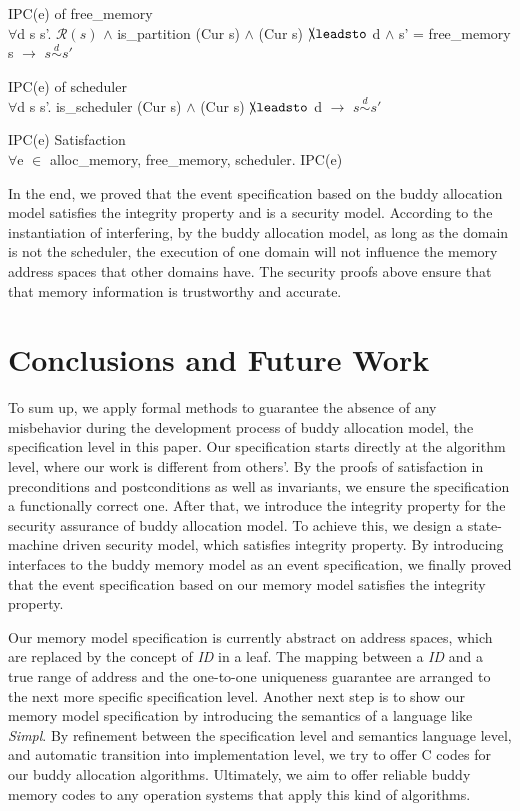 \documentclass[runningheads]{llncs}
\makeatletter
\newcommand{\equidom}[3]{{#1}\stackrel{#2}{\sim}{#3}}
\newcommand{\superimpose}[2]
	{{\ooalign{$#1\@firstoftwo#2$\cr\hfil$#1\@secondoftwo#2$\hfil\cr}}}
\newcommand{\ninterf}{\mathrel{\mathpalette\superimpose{{\slash}{\leadsto}}}}
\makeatother
\begin{document}
\begin{lemma} {IPC(e) of free\_memory} \\
$\forall$d s s'. $\mathcal{R}(s)$ $\wedge$ is\_partition (Cur s) $\wedge$ (Cur s) $\ninterf$ d $\wedge$ s' = free\_memory s $\longrightarrow$ $\equidom{s}{d}{s'}$
\end{lemma}

\begin{lemma} {IPC(e) of scheduler} \\
$\forall$d s s'. is\_scheduler (Cur s) $\wedge$ (Cur s) $\ninterf$ d $\longrightarrow$ $\equidom{s}{d}{s'}$
\end{lemma}

\begin{theorem} {IPC(e) Satisfaction} \\
$\forall$e $\in$ {alloc\_memory, free\_memory, scheduler}. IPC(e)
\end{theorem}

In the end, we proved that the event specification based on the buddy allocation model satisfies the integrity property and is a security model. According to the instantiation of interfering, by the buddy allocation model, as long as the domain is not the scheduler, the execution of one domain will not influence the memory address spaces that other domains have. The security proofs above ensure that that memory information is trustworthy and accurate.

\section{Conclusions and Future Work}
To sum up, we apply formal methods to guarantee the absence of any misbehavior during the development process of buddy allocation model, the specification level in this paper. Our specification starts directly at the algorithm level, where our work is different from others'. By the proofs of satisfaction in preconditions and postconditions as well as invariants, we ensure the specification a functionally correct one. After that, we introduce the integrity property for the security assurance of buddy allocation model. To achieve this, we design a state-machine driven security model, which satisfies integrity property. By introducing interfaces to the buddy memory model as an event specification, we finally proved that the event specification based on our memory model satisfies the integrity property.

Our memory model specification is currently abstract on address spaces, which are replaced by the concept of \emph{ID} in a leaf. The mapping between a \emph{ID} and a true range of address and the one-to-one uniqueness guarantee are arranged to the next more specific specification level. Another next step is to show our memory model specification by introducing the semantics of a language like \emph{Simpl}. By refinement between the specification level and semantics language level, and automatic transition into implementation level, we try to offer C codes for our buddy allocation algorithms. Ultimately, we aim to offer reliable buddy memory codes to any operation systems that apply this kind of algorithms.
\end{document}
